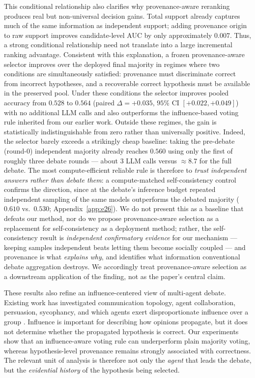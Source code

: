 This conditional relationship also clarifies why provenance-aware reranking produces real but non-universal decision gains. Total support already captures much of the same information as independent support; adding provenance origin to raw support improves candidate-level AUC by only approximately $0.007$. Thus, a strong conditional relationship need not translate into a large incremental ranking advantage. Consistent with this explanation, a frozen provenance-aware selector improves over the deployed final majority in regimes where two conditions are simultaneously satisfied: provenance must discriminate correct from incorrect hypotheses, and a recoverable correct hypothesis must be available in the preserved pool. Under these conditions the selector improves pooled accuracy from $0.528$ to $0.564$ (paired $\Delta=+0.035$, $95\%$ CI $[+0.022,+0.049]$) with no additional LLM calls and also outperforms the influence-based voting rule inherited from our earlier work. Outside these regimes, the gain is statistically indistinguishable from zero rather than universally positive. Indeed, the selector barely exceeds a strikingly cheap baseline: taking the pre-debate (round-$0$) independent majority already reaches $0.560$ using only the first of roughly three debate rounds --- about $3$ LLM calls versus $\approx\!8.7$ for the full debate. The most compute-efficient reliable rule is therefore to \emph{trust independent answers rather than debate them}: a compute-matched self-consistency control confirms the direction, since at the debate's inference budget repeated independent sampling of the same models outperforms the debated majority ($0.610$ vs.\ $0.530$; Appendix~\ref{app:e26}). We do not present this as a baseline that defeats our method, nor do we propose provenance-aware selection as a replacement for self-consistency as a deployment method; rather, the self-consistency result is \emph{independent confirmatory evidence} for our mechanism --- keeping samples independent beats letting them become socially coupled --- and provenance is what \emph{explains why}, and identifies what information conventional debate aggregation destroys. We accordingly treat provenance-aware selection as a downstream application of the finding, not as the paper's central claim.

These results also refine an influence-centered view of multi-agent debate. Existing work has investigated communication topology, agent collaboration, persuasion, sycophancy, and which agents exert disproportionate influence over a group \cite{li2024sparse,zhang2024collaboration,sharma2024sycophancy}. Influence is important for describing how opinions propagate, but it does not determine whether the propagated hypothesis is correct. Our experiments show that an influence-aware voting rule can underperform plain majority voting, whereas hypothesis-level provenance remains strongly associated with correctness. The relevant unit of analysis is therefore not only the \emph{agent} that leads the debate, but the \emph{evidential history} of the hypothesis being selected.

